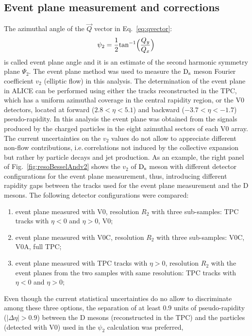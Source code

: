 \subsection{Event plane measurement and corrections}
The azimuthal angle of the $\vec{Q}$ vector in Eq.~\ref{eq:qvector}:
\begin{equation}
\label{eq:psi2}
\psi_2= \frac{1}{2} {\rm tan}^{-1} \Big (\frac{Q_y}{Q_x} \Big )
\end{equation}
is called event plane angle and it is an estimate of the second harmonic symmetry plane $\Psi_2$.
The event plane method was used to measure the ${\rm D_s}$ meson 
Fourier coefficient $v_2$ (elliptic flow) in this analysis.
The determination of the event plane in ALICE can be performed using
either the tracks reconstructed in the TPC, which has a uniform
azimuthal coverage in the central rapidity region, or the V0
detectors, located at forward ($2.8<\eta<5.1$) and backward
($-3.7<\eta<-1.7$) pseudo-rapidity.
In this analysis the event plane was obtained from the 
signals produced by the charged particles in the eight 
azimuthal sectors of each V0 array. 
The current uncertainties on the $v_2$ values do not allow to
appreciate different non-flow contributions, i.e.\,correlations not 
induced by the collective expansion but rather by particle decays and 
jet production. As an example, the right panel of Fig.~\ref{fig:resoBesselAndv2}
shows the $v_2$ of ${\rm D_s}$ meson with different detector configurations
for the event plane measurement, thus, introducing different
rapidity gaps between the tracks used for the event plane measurement
and the D mesons. 
The following detector configurations were compared:
\begin{enumerate}
\item event plane measured with V0,  
resolution $R_2$ with three sub-samples: TPC tracks with $\eta < 0$ and $\eta > 0$, V0; 
\item event plane measured with V0C,  
resolution $R_2$ with three sub-samples: V0C, V0A, full TPC; 
\item event plane measured with TPC tracks with $\eta > 0$,  
resolution $R_2$ with the event planes from the two samples with same resolution: 
TPC tracks with $\eta < 0$ and $\eta > 0$;
\end{enumerate}
Even though the current statistical uncertainties do no allow to discriminate among these three options,
the separation of at least 0.9 units of pseudo-rapidity 
($|\Delta\eta|>0.9$) between the D mesons (reconstructed in the TPC)
and the particles (detected with V0) used in the $\psi_2$ calculation was preferred,
